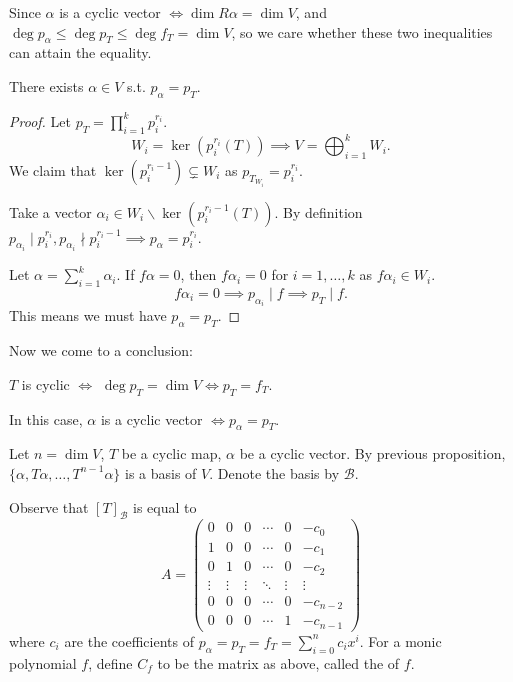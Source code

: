 Since $\alpha$ is a cyclic vector $\iff \dim R\alpha = \dim V$,
and $\deg p_\alpha \le \deg p_T \le \deg f_T = \dim V$,
so we care whether these two inequalities can attain the equality.

\begin{proposition}
	There exists $\alpha\in V$ s.t. $p_\alpha = p_T$.
\end{proposition}
\begin{proof}[Proof]
    Let $p_T = \prod_{i = 1}^k p_i^{r_i}$.
	\[
	W_i = \ker(p_i^{r_i}(T)) \implies V = \bigoplus_{i = 1}^k W_i.
	\]
	We claim that $\ker(p_i^{r_i - 1}) \subsetneq W_i$ as
	$p_{T_{W_i}} = p_i^{r_i}$.

	Take a vector $\alpha_i\in W_i \backslash \ker(p_i^{r_i - 1}(T))$.
	By definition $p_{\alpha_i} \mid p_i^{r_i}, p_{\alpha_i} \nmid p_i^{r_i - 1}
	\implies p_\alpha = p_i^{r_i}$.

	Let $\alpha = \sum_{i = 1}^{k} \alpha_i$. If $f\alpha = 0$,
	then $f\alpha_i = 0$ for $i = 1,\dots,k$ as $f\alpha_i \in W_i$.
	\[
	f\alpha_i = 0\implies p_{\alpha_i} \mid f \implies p_T \mid f.
	\]
	This means we must have $p_\alpha = p_T$.
\end{proof}

Now we come to a conclusion:
\begin{corollary}
    $T$ is cyclic $\iff$ $\deg p_T = \dim V \iff p_T = f_T$.

	In this case, $\alpha$ is a cyclic vector $\iff p_\alpha = p_T$.
\end{corollary}

Let $n = \dim V$, $T$ be a cyclic map, $\alpha$ be a cyclic vector.
By previous proposition, $\{\alpha, T\alpha, \dots, T^{n - 1}\alpha\}$ is
a basis of $V$. Denote the basis by $\mathcal{B}$.

Observe that $[T]_{\mathcal{B}}$ is equal to
\[
A = \begin{pmatrix}
	0 &0 &0 &\cdots &0 &-c_0\\
	1 &0 &0 &\cdots &0 &-c_1\\
	0 &1 &0 &\cdots &0 &-c_2\\
	\vdots &\vdots &\vdots &\ddots &\vdots &\vdots\\
	0 &0 &0 &\cdots &0 &-c_{n - 2}\\
	0 &0 &0 &\cdots &1 &-c_{n-1}
\end{pmatrix}
\]
where $c_i$ are the coefficients of $p_\alpha = p_T = f_T = \sum_{i=0}^{n} c_ix^i$.
For a monic polynomial $f$, define $C_f$ to be the matrix as above,
called the  of $f$.

